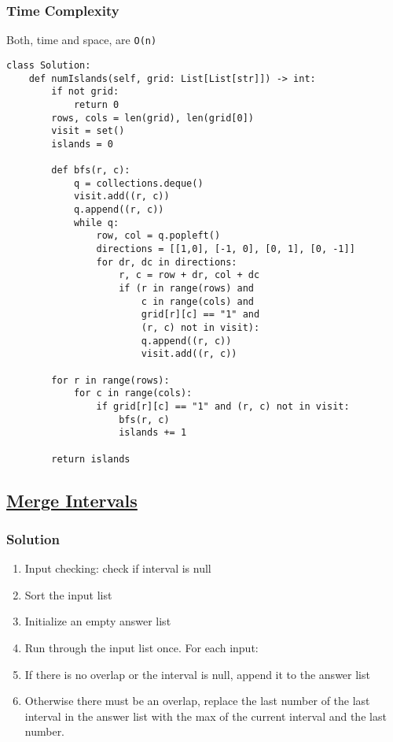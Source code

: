 \documentclass{article}
\begin{document}
\subsubsection{Time Complexity}
Both, time and space, are \lstinline{O(n)} 

\begin{lstlisting}
class Solution:
    def numIslands(self, grid: List[List[str]]) -> int:
        if not grid:
            return 0
        rows, cols = len(grid), len(grid[0])
        visit = set()
        islands = 0

        def bfs(r, c):
            q = collections.deque()
            visit.add((r, c))
            q.append((r, c))
            while q:
                row, col = q.popleft()
                directions = [[1,0], [-1, 0], [0, 1], [0, -1]]
                for dr, dc in directions:
                    r, c = row + dr, col + dc
                    if (r in range(rows) and
                        c in range(cols) and
                        grid[r][c] == "1" and
                        (r, c) not in visit):
                        q.append((r, c))
                        visit.add((r, c))
        
        for r in range(rows):
            for c in range(cols):
                if grid[r][c] == "1" and (r, c) not in visit:
                    bfs(r, c)
                    islands += 1
        
        return islands
\end{lstlisting}

\subsection{\href{https://leetcode.com/problems/merge-intervals/}{Merge Intervals}}

\subsubsection{Solution}
\begin{enumerate}
\item Input checking: check if interval is null
\item Sort the input list
\item Initialize an empty answer list
\item Run through the input list once. For each input:
\item If there is no overlap or the interval is null, append it to the answer list
\item Otherwise there must be an overlap, replace the last number of the last interval in the answer list with the max of the current interval and the last number.
\end{enumerate}
\end{document}
